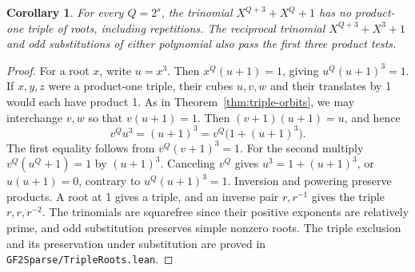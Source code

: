 \documentclass[11pt]{article}
\newtheorem{corollary}[theorem]{Corollary}
\begin{document}
\begin{corollary}\label{cor:cubic-triples}
For every \(Q=2^s\), the trinomial \(X^{Q+3}+X^Q+1\) has no
product-one triple of roots, including repetitions. The reciprocal
trinomial \(X^{Q+3}+X^3+1\) and odd substitutions of either polynomial
also pass the first three product tests.
\end{corollary}
\begin{proof}
For a root \(x\), write \(u=x^3\). Then \(x^Q(u+1)=1\), giving
\(u^Q(u+1)^3=1\). If \(x,y,z\) were a product-one triple, their
cubes \(u,v,w\) and their translates by 1 would each have product 1.
As in Theorem~\ref{thm:triple-orbits}, we may interchange \(v,w\) so
that \(v(u+1)=1\). Then \((v+1)(u+1)=u\), and hence
\[
 v^Q u^3=(u+1)^3=v^Q\bigl(1+(u+1)^3\bigr).
\]
The first equality follows from \(v^Q(v+1)^3=1\).
For the second multiply \(v^Q(u^Q+1)=1\) by \((u+1)^3\).
Canceling \(v^Q\) gives \(u^3=1+(u+1)^3\), or \(u(u+1)=0\),
contrary to \(u^Q(u+1)^3=1\).
Inversion and powering preserve products. A root at 1 gives a
triple, and an inverse pair \(r,r^{-1}\) gives the triple
\(r,r,r^{-2}\). The trinomials are squarefree since their positive
exponents are relatively prime, and odd substitution preserves simple
nonzero roots. The triple exclusion and its preservation under
substitution are proved in \texttt{GF2Sparse/TripleRoots.lean}.
\end{proof}
\end{document}
